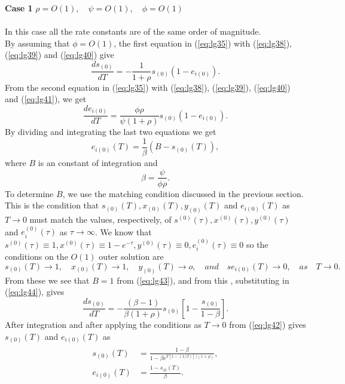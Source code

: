 \documentclass[a4paper]{report}
\theoremstyle{definition}
\begin{document}
\textbf{Case 1} \quad $\rho=O(1), \quad \psi=O(1), \quad \phi=O(1)$
\\
\\
In this case all the rate constants are of the same order of magnitude.
\\
By assuming that $\phi=O(1)$, the first equation in (\ref{eq:lg35}) with (\ref{eq:lg38}), (\ref{eq:lg39}) and (\ref{eq:lg40}) give
\begin{equation}
\frac{ds_{(0)}}{dT}=-\frac{1}{1+\rho}s_{(0)}(1-e_{i(0)}).
\label{eq:lg44}
\end{equation}
From the second equation in (\ref{eq:lg35}) with (\ref{eq:lg38}), (\ref{eq:lg39}), (\ref{eq:lg40}) and (\ref{eq:lg41}), we get
\begin{equation}
\frac{de_{i(0)}}{dT}=\frac{\phi\rho}{\psi(1+\rho)}s_{(0)}(1-e_{i(0)}).
\end{equation}
By dividing and integrating the last two equations we get
\begin{equation}
e_{i(0)}(T)=\frac{1}{\beta}(B-s_{(0)}(T)),
\label{eq:lg43}
\end{equation}
where $B$ is an constant of integration and
\begin{equation}
\beta=\frac{\psi}{\phi \rho}.
\end{equation} 
To determine $B$, we use the matching condition discussed in the previous section. This is the condition that $s_{(0)}(T), x_{(0)}(T), y_{(0)}(T)$ and $e_{i(0)}(T)$ as $T\rightarrow 0$ must match the values, respectively, of $s^{(0)}(\tau),x^{(0)}(\tau),y^{(0)}(\tau)$ and $e_i^{(0)}(\tau)$ as $\tau\rightarrow\infty$. We know that $s^{(0)}(\tau)\equiv 1, x^{(0)}(\tau)\equiv 1-e^{-\tau}, y^{(0)}(\tau)\equiv 0,e_i^{(0)}(\tau)\equiv 0$ so the conditions on the $O(1)$ outer solution are
\begin{equation}
s_{(0)}(T)\rightarrow 1, \quad x_{(0)}(T)\rightarrow 1, \quad y_{(0)}(T)\rightarrow o, \quad and \quad se_{i(0)}(T)\rightarrow 0, \quad as \quad T\rightarrow0.
\label{eq:lg42}
\end{equation}
From these we see that $B=1$ from (\ref{eq:lg43}), and from this , substituting in (\ref{eq:lg44}), gives
\begin{equation}
\frac{ds_{(0)}}{dT}=-\frac{(\beta -1)}{\beta(1+\rho)}s_{(0)}\left[1-\frac{s_{(0)}}{1-\beta}\right].
\end{equation}
After integration and after applying the conditions as $T\rightarrow0$ from (\ref{eq:lg42}) gives $s_{(0)}(T)$ and $e_{i(0)}(T)$ as
\begin{align}
\begin{split}
s_{(0)}(T)&=\frac{1-\beta}{1-\beta e^{T[1-(1/\beta)]/(1+\rho)}},\\
e_{i(0)}(T)&=\frac{1-s_{(0}(T)}{\beta}.
\end{split}
\end{align}
\\
\end{document}
